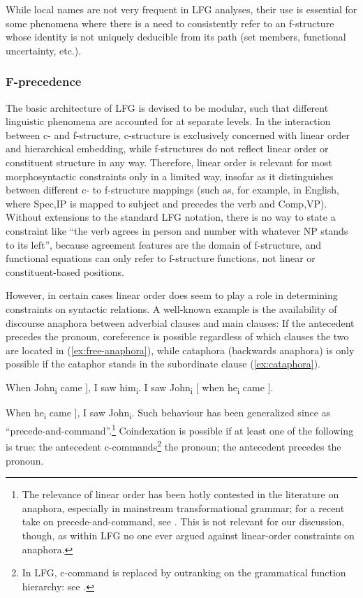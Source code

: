 \documentclass[output=paper,hidelinks]{langscibook}
\begin{document}
While local names are not very frequent in LFG analyses, their use is essential for some phenomena where there is a need to consistently refer to an f-structure whose identity is not uniquely deducible from its path (set members, functional uncertainty, etc.).
 
 \subsubsection{F-precedence\label{sect:fprec}}
 
 The basic architecture of LFG is devised to be modular, such that different linguistic phenomena are accounted for at separate levels. In the interaction between c- and f-structure, c-structure is exclusively concerned with linear order and hierarchical embedding, while f-structures do not reflect linear order or constituent structure in any way. Therefore, linear order is relevant for most morphosyntactic constraints only in a limited way, insofar as it distinguishes between different c- to f-structure mappings (such as, for example, in English, where Spec,IP is mapped to subject and precedes the verb and Comp,VP). Without extensions to the standard LFG notation, there is no way to state a constraint like ``the verb agrees in person and number with whatever NP stands to its left'', because agreement features are the domain of f-structure, and functional equations can only refer to f-structure functions, not linear or constituent-based positions.
 
 However, in certain cases linear order does seem to play a role in determining constraints on syntactic relations. A well-known example is the availability of discourse anaphora between adverbial clauses and main clauses: If the antecedent precedes the pronoun, coreference is possible regardless of which clauses the two are located in (\ref{ex:free-anaphora}), while cataphora (backwards anaphora) is only possible if the cataphor stands in the subordinate clause (\ref{ex:cataphora}).
 
 \ea\label{ex:free-anaphora}
    \ea {[} When John\textsubscript{i} came ], I saw him\textsubscript{i}.
    \ex I saw John\textsubscript{i} [ when he\textsubscript{i} came ].
    \z
 \z
 
 \ea\label{ex:cataphora}
    \ea {[} When he\textsubscript{i} came ], I saw John\textsubscript{i}.
    \z
 \z
Such behaviour has been generalized since \textcite{langacker1969} as ``precede-and-command''.\footnote{The relevance of linear order has been hotly contested in the literature on anaphora, especially in mainstream transformational grammar; for a recent take on precede-and-command, see \textcite{bruening2014}. This is not relevant for our discussion, though, as within LFG no one ever argued against linear-order constraints on anaphora.} Coindexation is possible if at least one of the following is true: the antecedent c-commands\footnote{In LFG, c-command is replaced by outranking on the grammatical function hierarchy: see .} the pronoun; the antecedent precedes the pronoun.
\end{document}

